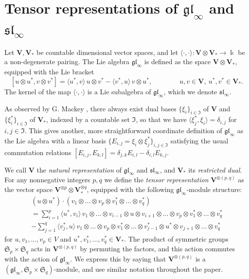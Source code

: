 \documentclass[12pt,reqno]{amsart}
\numberwithin{equation}{section}
\theoremstyle{plain}
\theoremstyle{definition}
\def\gl{\mathfrak{gl}}
\def\sl{\mathfrak{sl}}
\def\o{\otimes}
\def\VV{\mathbf V}
\def\<{\langle}
\def\>{\rangle}
\begin{document}
%
%
%



\section{Tensor representations of $\gl_\infty$ and $\sl_\infty$}
\label{sec:gl}



Let $\VV,\VV_*$ be countable dimensional vector spaces, and let
$\<\cdot,\cdot\>: \VV \o \VV_* \to \Bbbk$ be a non-degenerate
pairing. The Lie algebra
$\gl_\infty$ is defined as the space $\VV \o \VV_*$, equipped with
the Lie bracket
\begin{equation}\label{eq:def gl Lie bracket}
    [u \o u^*, v \o v^*] =
    \<u^*,v\> \, u \o v^* - \<v^*,u\> \, v \o u^*,
    \qquad\qquad
    u,v \in \VV, \ u^*,v^* \in \VV_*.
\end{equation}
The kernel of the map $\<\cdot,\cdot\>$ is a Lie subalgebra of $\gl_\infty$,
which we denote $\sl_\infty$.


As observed by G. Mackey \cite{M}, there always exist dual bases
$\{\xi_i\}_{i \in \mathfrak I}$ of $\VV$ and
$\{\xi_i^*\}_{i\in\mathfrak I}$ of $\VV_*$, indexed by a countable
set $\mathfrak I$, so that we have $\<\xi_j^*, \xi_i\> =
\delta_{i,j}$ for $i,j \in \mathfrak I$. This gives another, more
straightforward coordinate definition of $\gl_\infty$ as the Lie
algebra with a linear basis $\{E_{i,j}= \xi_i \o \xi_j^*\}_{i,j\in
\mathfrak I}$ satisfying the usual commutation relations
$[E_{i,j},E_{k,l}] = \delta_{j,k} E_{i,l} - \delta_{i,l} E_{k,j}$.

We call $\VV$ the {\it natural representation} of $\gl_\infty$ and
$\sl_\infty$, and $\VV_*$ its {\it restricted dual}. For any
nonnegative integers $p,q$ we define the {\it tensor representation}
$\VV^{\o(p,q)}$ as the vector space $\VV^{\o p} \otimes \VV_*^{\o q}$, equipped with the following $\gl_\infty$-module structure:
\begin{multline*}\label{eq:tensor action gl}
    (u \o u^*) \cdot ( v_1 \o\dots\o v_p \o v^*_1 \o\dots\o v^*_q)
    \\
    = \sum_{i=1}^p \<u^*,v_i\> \, v_1 \o \dots \o v_{i-1} \o
    u \o v_{i+1} \o \dots\o v_p \o v^*_1 \o\dots \o v_q^*
    \\
    - \sum_{j=1}^q \<v_j^*,u\> \, v_1 \o \dots \o v_p \o v^*_1 \o\dots\o v_{j-1}^* \o u^* \o v_{j+1}\o \dots \o
    v_q^*
\end{multline*}
for $u,v_1,\dots,v_p \in V$ and $u^*,v_1^*,\dots,v_q^* \in \VV_*$. The product of symmetric groups $\mathfrak S_p \times \mathfrak S_q$
acts in $\VV^{\o(p,q)}$ by permuting the factors, and this action
commutes with the action of $\gl_\infty$. We express this by saying
that $\VV^{\o(p,q)}$ is a $(\gl_\infty,\mathfrak S_p \times
\mathfrak S_q)$-module, and use similar notation throughout the
paper.
\end{document}
